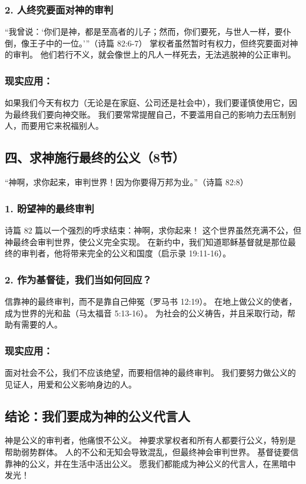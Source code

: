 \documentclass[a4paper, 12pt]{article}
\begin{document}
\subsubsection*{2. 人终究要面对神的审判}
“我曾说：‘你们是神，都是至高者的儿子；然而，你们要死，与世人一样，要仆倒，像王子中的一位。’”（诗篇 82:6-7）
掌权者虽然暂时有权力，但终究要面对神的审判。
他们若行不义，就会像世上的凡人一样死去，无法逃脱神的公正审判。
\subsubsection*{现实应用：}

如果我们今天有权力（无论是在家庭、公司还是社会中），我们要谨慎使用它，因为最终我们要向神交账。
我们要常常提醒自己，不要滥用自己的影响力去压制别人，而要用它来祝福别人。
\subsection*{四、求神施行最终的公义（8节）}
“神啊，求你起来，审判世界！因为你要得万邦为业。”（诗篇 82:8）

\subsubsection*{1. 盼望神的最终审判}
诗篇 82 篇以一个强烈的呼求结束：神啊，求你起来！
这个世界虽然充满不公，但神最终会审判世界，使公义完全实现。
在新约中，我们知道耶稣基督就是那位最终的审判者，他将带来完全的公义和国度（启示录 19:11-16）。
\subsubsection*{2. 作为基督徒，我们当如何回应？}
信靠神的最终审判，而不是靠自己伸冤（罗马书 12:19）。
在地上做公义的使者，成为世界的光和盐（马太福音 5:13-16）。
为社会的公义祷告，并且采取行动，帮助有需要的人。
\subsubsection*{现实应用：}

面对社会不公，我们不应该绝望，而要相信神的最终审判。
我们要努力做公义的见证人，用爱和公义影响身边的人。
\subsection*{结论：我们要成为神的公义代言人}
神是公义的审判者，他痛恨不公义。
神要求掌权者和所有人都要行公义，特别是帮助弱势群体。
人的不公和无知会导致混乱，但最终神会审判世界。
基督徒要信靠神的公义，并在生活中活出公义。
愿我们都能成为神公义的代言人，在黑暗中发光！
\end{document}
